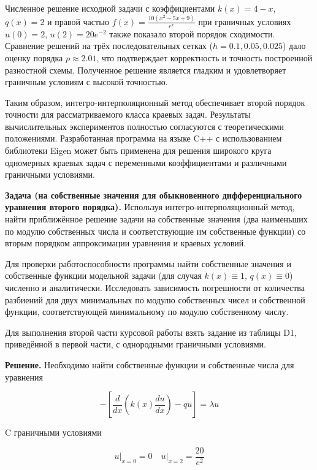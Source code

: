 \documentclass[a4paper,12pt]{article}
\begin{document}
	Численное решение исходной задачи с коэффициентами $k(x) = 4 - x$, $q(x) = 2$ и правой частью $f(x) = \frac{10(x^2 - 5x + 9)}{e^x}$ при граничных условиях $u(0) = 2$, $u(2) = 20e^{-2}$ также показало второй порядок сходимости. Сравнение решений на трёх последовательных сетках ($h = 0.1, 0.05, 0.025$) дало оценку порядка $p \approx 2.01$, что подтверждает корректность и точность построенной разностной схемы. Полученное решение является гладким и удовлетворяет граничным условиям с высокой точностью.
	
	Таким образом, интегро-интерполяционный метод обеспечивает второй порядок точности для рассматриваемого класса краевых задач. Результаты вычислительных экспериментов полностью согласуются с теоретическими положениями. Разработанная программа на языке C++ с использованием библиотеки Eigen может быть применена для решения широкого круга одномерных краевых задач с переменными коэффициентами и различными граничными условиями.
	
	\quad \textbf{Задача (на собственные значения для обыкновенного дифференциального уравнения второго порядка).} Используя интегро-интерполяционный метод, найти приближённое решение задачи на собственные значения (два наименьших по модулю собственных числа и соответствующие им собственные функции) со вторым порядком аппроксимации уравнения и краевых условий.
	
	Для проверки работоспособности программы найти собственные значения и собственные функции модельной задачи (для случая $k(x) \equiv 1$, $q(x) \equiv 0$) численно и аналитически. Исследовать зависимость погрешности от количества разбиений для двух минимальных по модулю собственных чисел и собственной функции, соответствующей минимальному по модулю собственному числу.
	
	Для выполнения второй части курсовой работы взять задание из таблицы D1, приведённой в первой части, с однородными граничными условиями.
	
	\quad \textbf{Решение.} Необходимо найти собственные функции и собственные числа для уравнения
	
	\begin{equation}
		-\left[\dfrac{d}{dx} \left(k(x) \dfrac{du}{dx}\right) - qu\right] = \lambda u
	\end{equation}
	
	\quad C граничными условиями
	
	\begin{equation}
		u \bigg|_{x = 0} = 0 \quad u\bigg|_{x=2} = \dfrac{20}{e^2} 
	\end{equation}
	
\end{document}
